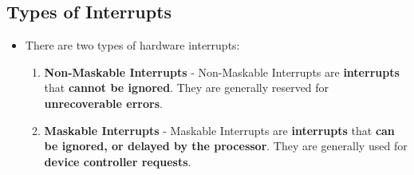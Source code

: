 \documentclass[16pt]{article}
\begin{document}
    \subsection*{Types of Interrupts}
    \begin{itemize}
        \item There are two types of hardware interrupts:
        \begin{enumerate}
            \item \textbf{Non-Maskable Interrupts} - Non-Maskable Interrupts are \textbf{interrupts} that \textbf{cannot be ignored}. They are generally reserved for \textbf{unrecoverable errors}.
            \item \textbf{Maskable Interrupts} - Maskable Interrupts are \textbf{interrupts} that \textbf{can be ignored, or delayed by the processor}. They are generally used for \textbf{device controller requests}.
        \end{enumerate}
    \end{itemize}

\section*{}
\end{document}
